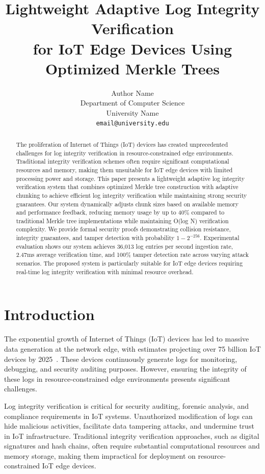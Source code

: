 \documentclass[a4paper,10pt]{article}
\title{\textbf{Lightweight Adaptive Log Integrity Verification \\ for IoT Edge Devices Using Optimized Merkle Trees}}
\author{
\begin{tabular}{c}
Author Name \\
Department of Computer Science \\
University Name \\
\texttt{email@university.edu}
\end{tabular}
}
\date{}
\begin{document}
\maketitle

\begin{abstract}
The proliferation of Internet of Things (IoT) devices has created unprecedented challenges for log integrity verification in resource-constrained edge environments. Traditional integrity verification schemes often require significant computational resources and memory, making them unsuitable for IoT edge devices with limited processing power and storage. This paper presents a lightweight adaptive log integrity verification system that combines optimized Merkle tree construction with adaptive chunking to achieve efficient log integrity verification while maintaining strong security guarantees. Our system dynamically adjusts chunk sizes based on available memory and performance feedback, reducing memory usage by up to 40\% compared to traditional Merkle tree implementations while maintaining O(log N) verification complexity. We provide formal security proofs demonstrating collision resistance, integrity guarantees, and tamper detection with probability $1 - 2^{-256}$. Experimental evaluation shows our system achieves 36,013 log entries per second ingestion rate, 2.47ms average verification time, and 100\% tamper detection rate across varying attack scenarios. The proposed system is particularly suitable for IoT edge devices requiring real-time log integrity verification with minimal resource overhead.
\end{abstract}

\section{Introduction}
\label{sec:introduction}

The exponential growth of Internet of Things (IoT) devices has led to massive data generation at the network edge, with estimates projecting over 75 billion IoT devices by 2025~\cite{iot_stats}. These devices continuously generate logs for monitoring, debugging, and security auditing purposes. However, ensuring the integrity of these logs in resource-constrained edge environments presents significant challenges.

Log integrity verification is critical for security auditing, forensic analysis, and compliance requirements in IoT systems. Unauthorized modification of logs can hide malicious activities, facilitate data tampering attacks, and undermine trust in IoT infrastructure. Traditional integrity verification approaches, such as digital signatures and hash chains, often require substantial computational resources and memory storage, making them impractical for deployment on resource-constrained IoT edge devices.
\end{document}
